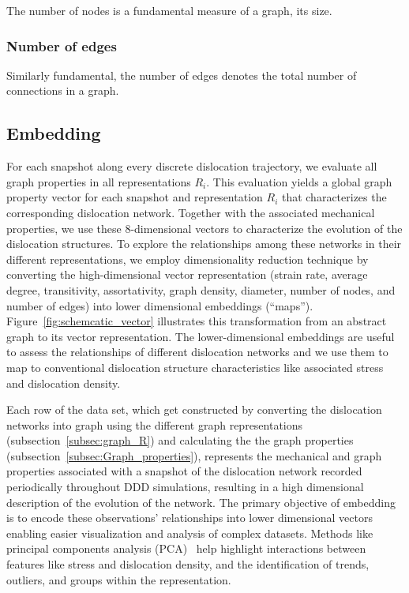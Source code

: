 \documentclass[pdflatex,sn-mathphys-num]{sn-jnl}%
\theoremstyle{thmstyleone}%
\theoremstyle{thmstyletwo}%
\theoremstyle{thmstylethree}%
\begin{document}
The number of nodes is a fundamental measure of a graph, its size.

\subsubsection*{Number of edges}\label{subsubsec:num_edges}

Similarly fundamental, the number of edges denotes the total number of connections in a graph.

\subsection{Embedding}\label{subsec:embeddding}

For each snapshot along every discrete dislocation trajectory, we evaluate all graph properties in all representations $R_i$.
This evaluation yields a global graph property vector for each snapshot and representation $R_i$ that characterizes the corresponding dislocation network.
Together with the associated mechanical properties, we use these 8-dimensional vectors to characterize the evolution of the dislocation structures.
To explore the relationships among these networks in their different representations, we employ dimensionality reduction technique by converting the high-dimensional vector representation (strain rate, average degree, transitivity, assortativity, graph density, diameter,  number of nodes, and number of edges) into lower dimensional embeddings (``maps'').
Figure~\ref{fig:schemcatic_vector} illustrates this transformation from an abstract graph to its vector representation.
The lower-dimensional embeddings are useful to assess the relationships of different dislocation networks and we use them to map to conventional dislocation structure characteristics like associated stress and dislocation density.

Each row of the data set, which get constructed by converting the dislocation networks into graph using the different graph representations (subsection~\ref{subsec:graph_R}) and calculating the the graph properties (subsection~\ref{subsec:Graph_properties}), represents the mechanical and graph properties associated with a snapshot of the dislocation network recorded periodically throughout DDD simulations, resulting in a high dimensional description of the evolution of the network. The primary objective of embedding is to encode these observations' relationships into lower dimensional vectors enabling easier visualization and analysis of complex datasets.
Methods like principal components analysis (PCA)~\cite{Pedregosa_Scikit-learn_Machine_Learning_2011} help highlight interactions between features like stress and dislocation density, and the identification of trends, outliers, and groups within the representation.
\end{document}
